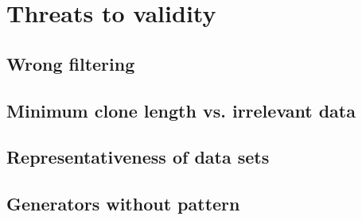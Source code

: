 \section{Threats to validity}

\subsection{Wrong filtering}

\subsection{Minimum clone length vs. irrelevant data}

\subsection{Representativeness of data sets}

\subsection{Generators without pattern}